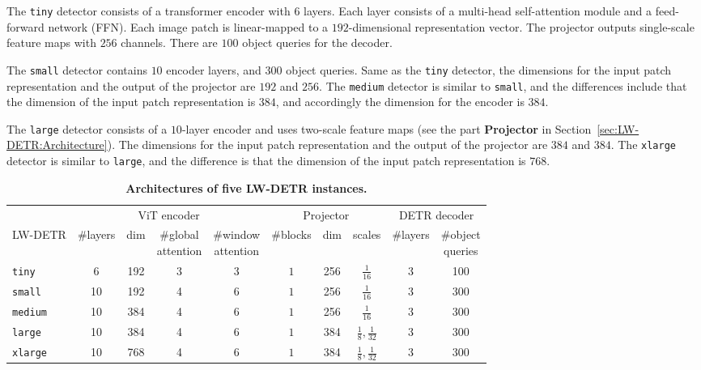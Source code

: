 \documentclass[runningheads]{llncs}
\begin{document}
The \texttt{tiny} detector consists of a transformer encoder with $6$ layers. 
Each layer consists of a multi-head self-attention module and a feed-forward network (FFN). Each image patch is linear-mapped to a $192$-dimensional representation vector. 
The projector outputs single-scale feature maps with $256$ channels. There are $100$ object queries for the decoder.

The \texttt{small} detector contains $10$ encoder layers, and $300$ object queries. Same as the \texttt{tiny} detector, the dimensions for the input patch representation and the output of the projector are $192$ and $256$. The \texttt{medium} detector is similar to \texttt{small}, 
and the differences include that the dimension of the input patch representation is $384$,
and accordingly the dimension for the encoder is $384$. 

The \texttt{large} detector consists of a $10$-layer encoder and uses two-scale feature maps (see the part \textbf{Projector} in Section~\ref{sec:LW-DETR:Architecture}). The dimensions for the input patch representation and the output of the projector are $384$ and $384$. The \texttt{xlarge} detector is similar to \texttt{large}, and the difference is that the dimension of the input patch representation is $768$. 

\begin{table}[t]
  \centering
    \setlength{\tabcolsep}{6pt}
    \renewcommand{\arraystretch}{1.41}
    \tiny
  \caption{\textbf{Architectures of five LW-DETR instances.}
  }
  \vspace{-2mm}
  \begin{tabular}{l|cccc|ccc|cc}
    & \multicolumn{4}{c|}{ViT encoder} & \multicolumn{3}{c|}{Projector} & \multicolumn{2}{c}{DETR decoder} \\
    LW-DETR &  \#layers & dim & \makecell{\#global\\ attention} & \makecell{\#window\\attention} & \#blocks & dim & scales & \#layers  & \makecell{\#object\\queries}\\
    \shline
    \texttt{tiny} & 6 & 192 & 3&3 & $ 1$ & 256 & $\frac{1}{16}$ & 3 &  100 \\
    \texttt{small}  & 10 & 192 & 4&6 & $ 1$ & 256 & $\frac{1}{16}$ & 3 &  300 \\
    \texttt{medium}  & 10 & 384 & 4&6 & $ 1$ & 256 & $\frac{1}{16}$ & 3 &  300 \\
    \texttt{large} & 10 & 384 & 4&6 & $ 1$ & 
 384 & $\frac{1}{8}, \frac{1}{32}$ & 3 &  300 \\
    \texttt{xlarge}  & 10 & 768 & 4&6 & $ 1$ & 384 & $\frac{1}{8}, \frac{1}{32}$ & 3  & 300 \\
  \end{tabular}
  \label{tab:modelscaling}
  \vspace{-2mm}
\end{table}
\end{document}

